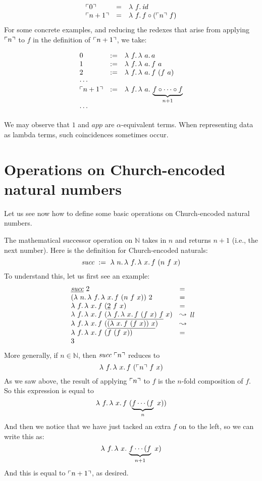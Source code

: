 \[
\begin{array}{lll}
  \ulcorner 0 \urcorner & = & \lambda\ f.\, \textit{id} \\ 
  \ulcorner n+1 \urcorner & = & \lambda\ f.\, f \circ (\ulcorner n \urcorner\ f)
\end{array}
\]
\noindent For some concrete examples, and reducing the redexes that arise from applying $\ulcorner n \urcorner$ to $f$ in the
definition of $\ulcorner n+1 \urcorner$, we take:

\[
\begin{array}{lll}
  0 & := & \lam{f}{\lam{a}{a}} \\
  1 & := & \lam{f}{\lam{a}{f\ a}} \\
  2 & := & \lam{f}{\lam{a}{f\ (f\ a)}} \\
  \multicolumn{3}{l}{\cdots} \\
  \rep{n+1} & := & \lam{f}{\lam{a}{\underbrace{f \circ \cdots \circ f}_{n+1}}} \\
  \multicolumn{3}{l}{\cdots}
\end{array}
\]

\noindent We may observe that $1$ and $\textit{app}$ are $\alpha$-equivalent
terms.  When representing data as lambda terms, such coincidences
sometimes occur.

\section{Operations on Church-encoded natural numbers}

Let us see now how to define some basic operations on Church-encoded
natural numbers.

 The mathematical successor
operation on $\mathbb{N}$ takes in $n$
and returns $n+1$ (i.e., the next number).  Here is the definition for
Church-encoded naturals:
\[
\textit{succ}\ :=\ \lam{n}{\lam{f}{\lam{x}{f\ (n\ f\ x)}}}
\]
\noindent To understand this, let us first see an example:
\[
\begin{array}{ll}
  \underline{\textit{succ}}\ 2 & = \\
  (\lambda\ n.\, \lambda\ f.\, \lambda\ x.\, f\ (n\ f\ x))\ 2 & = \\
  \lambda\ f.\, \lambda\ x.\, f\ (\underline{2}\ f\ x) & = \\
  \lambda\ f.\, \lambda\ x.\, f\ (\underline{\lambda\ f.\, \lambda\ x.\, f\ (f\ x)\ f}\ x) & \leadsto \\
  \lambda\ f.\, \lambda\ x.\, f\ (\underline{(\lambda\ x.\, f\ (f\ x))\ x}) & \leadsto \\
  \lambda\ f.\, \lambda\ x.\, f\ (f\ (f\ x)) & = \\
  3
\end{array}{ll}
\]
More generally, if $n\in\mathbb{N}$, then $\textit{succ}\ \ulcorner n \urcorner$ reduces to
\[
\lam{f}{\lam{x}{f\ (\rep{n}\ f\ x)}}
\]
\noindent As we saw above, the result of applying $\ulcorner n \urcorner$ to $f$ is the $n$-fold composition of $f$.  So this
expression is equal to 
\[
\lambda\ f.\, \lambda\ x.\, f\ (\underbrace{f \cdots (f }_{n}\ x))
\]
\noindent And then we notice that we have just tacked an extra $f$ on to the left, so we can write this as:
\[
\lam{f}{\lam{x}{\underbrace{f \cdots (f }_{n+1}\ x)}}
\]
\noindent And this is equal to $\ulcorner n+1 \urcorner$, as desired.

